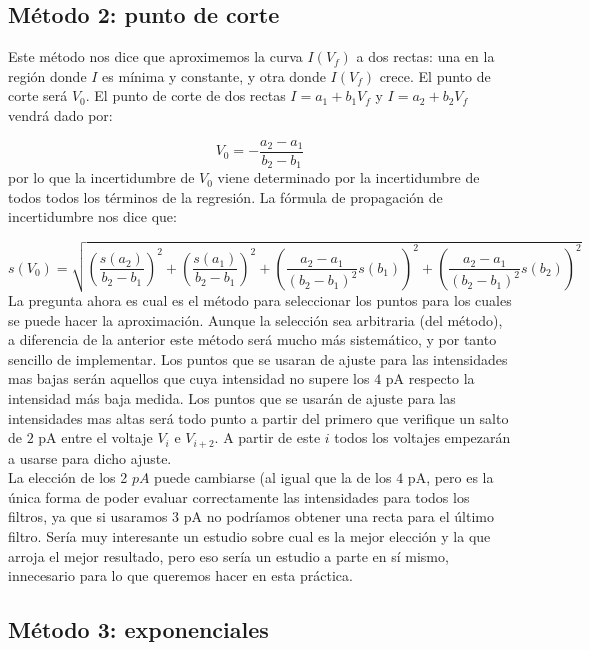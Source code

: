 \documentclass[12pt,a4paper]{article}
\numberwithin{equation}{section}
\numberwithin{table}{section}
\numberwithin{figure}{section}
\newcommand{\parentesis}[1]{\left( #1  \right)}
\begin{document}
\subsection{Método 2: punto de corte}\label{Subsec:2.2}

Este método nos dice que aproximemos la curva $I(V_f)$ a dos rectas: una en la región donde $I$ es mínima y constante, y otra donde $I(V_f)$ crece. El punto de corte será $V_0$. El punto de corte de dos rectas $I=a_1+b_1V_f$ y $I=a_2+b_2 V_f$ vendrá dado por:

\begin{equation}
V_0 = -\frac{a_2-a_1}{b_2-b_1}
\end{equation}
por lo que la incertidumbre de $V_0$ viene determinado por la incertidumbre de todos todos los términos de la regresión. La fórmula de propagación de incertidumbre nos dice que:

\begin{equation}
s(V_0) = \sqrt{\parentesis{\frac{s(a_2)}{b_2-b_1}}^2+\parentesis{\frac{s(a_1)}{b_2-b_1}}^2+\parentesis{\frac{a_2-a_1}{(b_2-b_1)^2}s(b_1)}^2+\parentesis{\frac{a_2-a_1}{(b_2-b_1)^2}s(b_2)}^2} \label{Ec:2.8}
\end{equation}
La pregunta ahora es cual es el método para seleccionar los puntos para los cuales se puede hacer la aproximación. Aunque la selección sea arbitraria (del método), a diferencia de la anterior este método será mucho más sistemático, y por tanto sencillo de implementar. Los puntos que se usaran de ajuste para las intensidades mas bajas serán aquellos que cuya intensidad no supere los $4$ pA respecto la intensidad más baja medida. Los puntos que se usarán de ajuste para las intensidades mas altas será todo punto a partir del primero que verifique un salto de $2 $ pA entre el voltaje $V_i$ e $V_{i+2}$. A partir de este $i$ todos los voltajes empezarán a usarse para dicho ajuste. \\

La elección de los 2 $pA$ puede cambiarse (al igual que la de los $4$ pA, pero es la única forma de poder evaluar correctamente las intensidades para todos los filtros, ya que si usaramos 3 pA no podríamos obtener una recta para el último filtro. Sería muy interesante un estudio sobre cual es la mejor elección y la que arroja el mejor resultado, pero eso sería un estudio a parte en sí mismo, innecesario para lo que queremos hacer en esta práctica.


\subsection{Método 3: exponenciales} \label{Subsec:2.3}
\end{document}

